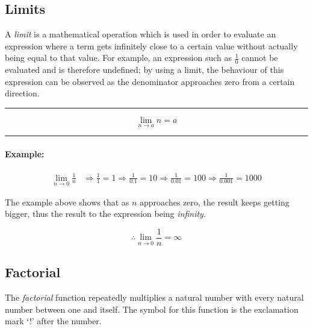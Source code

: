 \documentclass[a5paper,9pt]{book}
\theoremstyle{definition}
\newcommand{\eqlinesur}[1]{%
    \vspace*{\baselineskip}

    \hrule%

    \vspace*{\medskipamount}

    #1

    \vspace*{\medskipamount-0.5\belowdisplayskip}

    \hrule%

    \vspace*{\baselineskip}
}
\begin{document}
            \subsection{Limits}

            A \emph{limit} is a mathematical operation which is used in order to evaluate
            an expression where a term gets infinitely close to a certain value without
            actually being equal to that value. For example, an expression such as $\frac{1}{0}$
            cannot be evaluated and is therefore undefined; by using a limit, the behaviour
            of this expression can be observed as the denominator approaches zero from 
            a certain direction.

            \eqlinesur{%
                \begin{equation*}
                    \lim_{n\rightarrow a} n = a
                \end{equation*}
            }

            \vspace{-\baselineskip}

            \paragraph{Example:}

            \begin{align*}
                \lim_{n\rightarrow 0} \frac{1}{n} &\Longrightarrow \frac{1}{1} = 1 \Longrightarrow \frac{1}{0.1} = 10
                \Longrightarrow \frac{1}{0.01} = 100 \Longrightarrow \frac{1}{0.001} = 1000
            \end{align*}

            The example above shows that as $n$ approaches zero, the result keeps getting
            bigger, thus the result to the expression being \emph{infinity}.

            \begin{equation*}
                \therefore \lim_{n\rightarrow 0} \frac{1}{n} = \infty
            \end{equation*}

            \pagebreak

            \subsection{Factorial}

            The \emph{factorial} function repeatedly multiplies a natural number with
            every natural number between one and itself. The symbol for this function
            is the exclamation mark `!' after the number.
\end{document}
